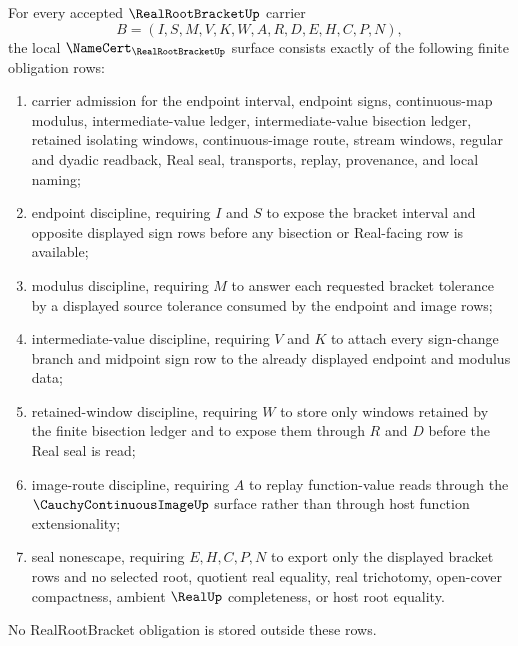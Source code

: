 \begin{theorem}
\label{thm:real-root-bracket-namecert-obligations}
For every accepted $\RealRootBracketUp$ carrier
$$
B=(I,S,M,V,K,W,A,R,D,E,H,C,P,N),
$$
the local $\NameCert_{\RealRootBracketUp}$ surface consists exactly of the following finite obligation rows:
\begin{enumerate}
\item carrier admission for the endpoint interval, endpoint signs, continuous-map modulus, intermediate-value ledger, intermediate-value bisection ledger, retained isolating windows, continuous-image route, stream windows, regular and dyadic readback, Real seal, transports, replay, provenance, and local naming;
\item endpoint discipline, requiring $I$ and $S$ to expose the bracket interval and opposite displayed sign rows before any bisection or Real-facing row is available;
\item modulus discipline, requiring $M$ to answer each requested bracket tolerance by a displayed source tolerance consumed by the endpoint and image rows;
\item intermediate-value discipline, requiring $V$ and $K$ to attach every sign-change branch and midpoint sign row to the already displayed endpoint and modulus data;
\item retained-window discipline, requiring $W$ to store only windows retained by the finite bisection ledger and to expose them through $R$ and $D$ before the Real seal is read;
\item image-route discipline, requiring $A$ to replay function-value reads through the $\CauchyContinuousImageUp$ surface rather than through host function extensionality;
\item seal nonescape, requiring $E,H,C,P,N$ to export only the displayed bracket rows and no selected root, quotient real equality, real trichotomy, open-cover compactness, ambient $\RealUp$ completeness, or host root equality.
\end{enumerate}
No RealRootBracket obligation is stored outside these rows.
\end{theorem}
